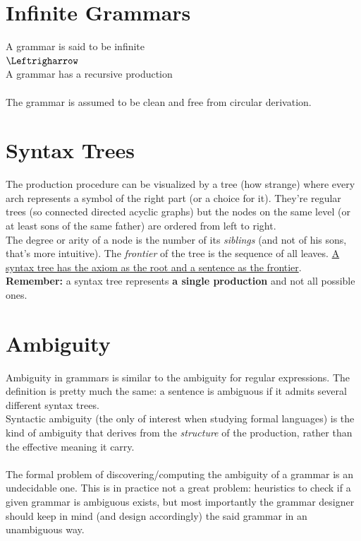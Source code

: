 \documentclass[10pt,a4paper]{article}
\begin{document}
        \section{Infinite Grammars}
            A grammar is said to be infinite\\
            $\Leftrigharrow$\\
            A grammar has a recursive production\\\\
            The grammar is assumed to be clean and free from circular derivation. 
	       
	    \section{Syntax Trees}
	    	The production procedure can be visualized by a tree (how strange) where every arch represents a symbol of the right part (or a choice for it). They're regular trees (so connected directed acyclic graphs) but the nodes on the same level (or at least sons of the same father) are ordered from left to right.\\
	    	The degree or arity of a node is the number of its \emph{siblings} (and not of his sons, that's more intuitive). The \emph{frontier} of the tree is the sequence of all leaves. \underline{A syntax tree has the axiom as the root and a sentence as the frontier}.\\
	    	\textbf{Remember:} a syntax tree represents \textbf{a single production} and not all possible ones.
		
		\section{Ambiguity}
			Ambiguity in grammars is similar to the ambiguity for regular expressions. The definition is pretty much the same: a sentence is ambiguous if it admits several different syntax trees.\\
			Syntactic ambiguity (the only of interest when studying formal languages) is the kind of ambiguity that derives from the \emph{structure} of the production, rather than the effective meaning it carry.\\\\
			The formal problem of discovering/computing the ambiguity of a grammar is an undecidable one. This is in practice not a great problem: heuristics to check if a given grammar is ambiguous exists, but most importantly the grammar designer should keep in mind (and design accordingly) the said grammar in an unambiguous way.
			
\end{document}
